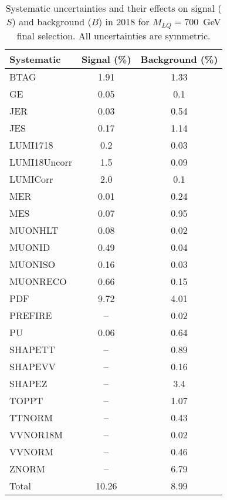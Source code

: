 \begin{table}[htbp]
\begin{center}
\caption{Systematic uncertainties and their effects on signal ($S$) and background ($B$) in 2018 for $M_{LQ}=700$~GeV final selection. All uncertainties are symmetric.}
\begin{tabular}{lcc}
\hline\hline
Systematic & Signal (\%) & Background (\%) \\ \hline 
BTAG & 1.91 & 1.33\\ 
GE & 0.05 & 0.1\\ 
JER & 0.03 & 0.54\\ 
JES & 0.17 & 1.14\\ 
LUMI1718 & 0.2 & 0.03\\ 
LUMI18Uncorr & 1.5 & 0.09\\ 
LUMICorr & 2.0 & 0.1\\ 
MER & 0.01 & 0.24\\ 
MES & 0.07 & 0.95\\ 
MUONHLT & 0.08 & 0.02\\ 
MUONID & 0.49 & 0.04\\ 
MUONISO & 0.16 & 0.03\\ 
MUONRECO & 0.66 & 0.15\\ 
PDF & 9.72 & 4.01\\ 
PREFIRE & -- & 0.02\\ 
PU & 0.06 & 0.64\\ 
SHAPETT & -- & 0.89\\ 
SHAPEVV & -- & 0.16\\ 
SHAPEZ & -- & 3.4\\ 
TOPPT & -- & 1.07\\ 
TTNORM & -- & 0.43\\ 
VVNOR18M & -- & 0.02\\ 
VVNORM & -- & 0.46\\ 
ZNORM & -- & 6.79\\ 
Total & 10.26 & 8.99\\ \hline \hline
\end{tabular}
\label{tab:SysUncertainties_uujj_700}
\end{center}
\end{table}

